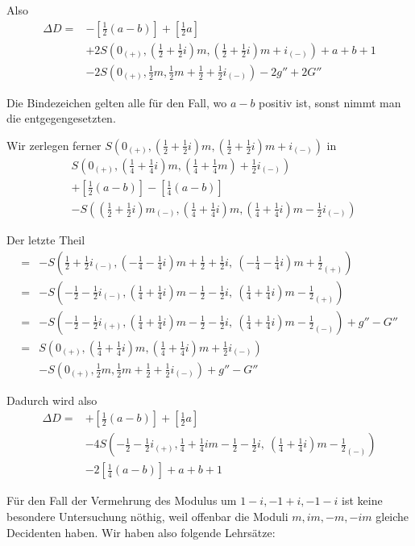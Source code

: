 Also
\[
\begin{aligned}
\Delta D={}&-\left[\tfrac12(a-b)\right]+\left[\tfrac12a\right]\\
&+2S(0_{(+)},(\tfrac12+\tfrac12i)m,(\tfrac12+\tfrac12i)m+i_{(-)})+a+b+1\\
&-2S(0_{(+)},\tfrac12m,\tfrac12m+\tfrac12+\tfrac12i_{(-)})-2g''+2G''
\end{aligned}
\]

Die Bindezeichen gelten alle für den Fall, wo $a-b$ positiv ist, sonst nimmt man die entgegengesetzten.

Wir zerlegen ferner $S(0_{(+)},(\frac12+\frac12i)m,(\frac12+\frac12i)m+i_{(-)})$ in
\[
\begin{aligned}
&S(0_{(+)},(\tfrac14+\tfrac14i)m,(\tfrac14+\tfrac14m)+\tfrac12i_{(-)})\\
&+\left[\tfrac12(a-b)\right]-\left[\tfrac14(a-b)\right]\\
&-S((\tfrac12+\tfrac12i)m_{(-)},(\tfrac14+\tfrac14i)m,(\tfrac14+\tfrac14i)m-\tfrac12i_{(-)})
\end{aligned}
\]


Der letzte Theil
\[
\begin{aligned}
={}&-S(\tfrac12+\tfrac12i_{(-)},(-\tfrac14-\tfrac14i)m+\tfrac12+\tfrac12i,\ (-\tfrac14-\tfrac14i)m+\tfrac12_{(+)})\\
={}&-S(-\tfrac12-\tfrac12i_{(-)},(\tfrac14+\tfrac14i)m-\tfrac12-\tfrac12i,\ (\tfrac14+\tfrac14i)m-\tfrac12_{(+)})\\
={}&-S(-\tfrac12-\tfrac12i_{(+)},(\tfrac14+\tfrac14i)m-\tfrac12-\tfrac12i,\ (\tfrac14+\tfrac14i)m-\tfrac12_{(-)})+g''-G''\\
={}&S(0_{(+)},(\tfrac14+\tfrac14i)m,(\tfrac14+\tfrac14i)m+\tfrac12i_{(-)})\\
&-S(0_{(+)},\tfrac12m,\tfrac12m+\tfrac12+\tfrac12i_{(-)})+g''-G''
\end{aligned}
\]

Dadurch wird also
\[
\begin{aligned}
\Delta D={}&+\left[\tfrac12(a-b)\right]+\left[\tfrac12a\right]\\
&-4S(-\tfrac12-\tfrac12i_{(+)},\tfrac14+\tfrac14im-\tfrac12-\tfrac12i,\ (\tfrac14+\tfrac14i)m-\tfrac12_{(-)})\\
&-2\left[\tfrac14(a-b)\right]+a+b+1
\end{aligned}
\]

Für den Fall der Vermehrung des Modulus um $1-i,-1+i,-1-i$ ist keine besondere Untersuchung nöthig, weil offenbar die Moduli $m,im,-m,-im$ gleiche Decidenten haben. Wir haben also folgende Lehrsätze:


